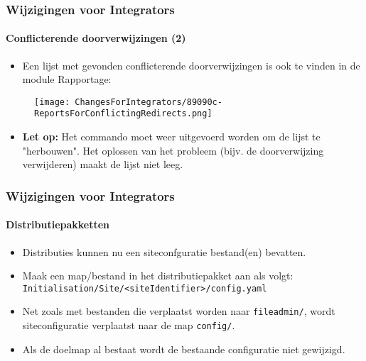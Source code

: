 
\begin{frame}[fragile]
	\frametitle{Wijzigingen voor Integrators}
	\framesubtitle{Conflicterende doorverwijzingen (2)}

	\begin{itemize}
		\item Een lijst met gevonden conflicterende doorverwijzingen is ook te vinden in de module Rapportage:
	\end{itemize}

	\begin{figure}
		\texttt{[image: ChangesForIntegrators/89090c-ReportsForConflictingRedirects.png]}
	\end{figure}

	\begin{itemize}
		\item
			\small\textbf{Let op:}
				Het commando moet weer uitgevoerd worden om de lijst te "herbouwen".
				Het oplossen van het probleem (bijv. de doorverwijzing verwijderen) maakt de lijst niet leeg.
			\normalsize
	\end{itemize}

\end{frame}


\begin{frame}[fragile]
	\frametitle{Wijzigingen voor Integrators}
	\framesubtitle{Distributiepakketten}

	\lstset{basicstyle=\tiny\ttfamily}

	\begin{itemize}
		\item Distributies kunnen nu een siteconfguratie bestand(en) bevatten.

		\item Maak een map/bestand in het distributiepakket aan als volgt:\newline
			\texttt{Initialisation/Site/<siteIdentifier>/config.yaml}

		\item Net zoals met bestanden die verplaatst worden naar \texttt{fileadmin/},\newline
			wordt siteconfiguratie verplaatst naar de map \texttt{config/}.

		\item Als de doelmap al bestaat wordt de bestaande configuratie niet gewijzigd.
	\end{itemize}

\end{frame}

